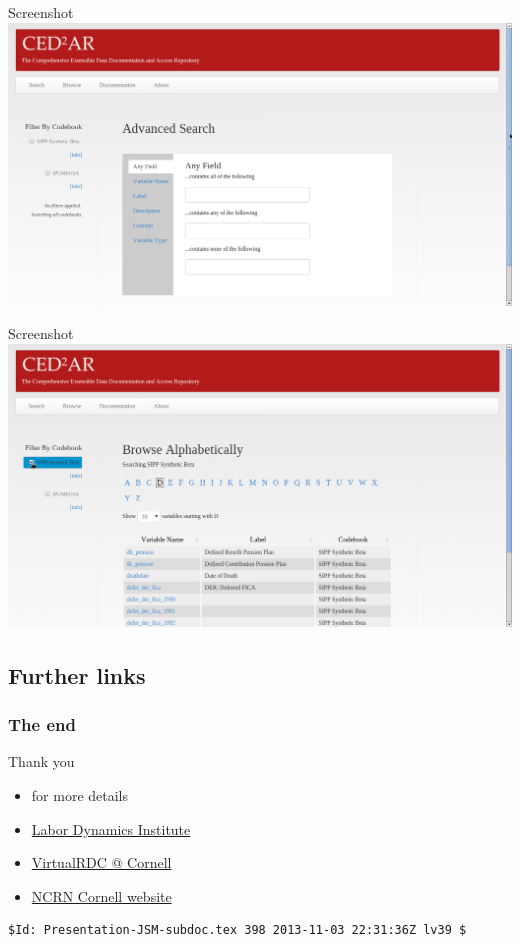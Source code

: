 \begin{frame}{Screenshot}
\includegraphics[width=\textwidth]{ced2ar-20130803-advanced.png}
\end{frame}
\begin{frame}{Screenshot}
\includegraphics[width=\textwidth]{ced2ar-20130803-browse.png}
\end{frame}

\subsection{Further links}
\begin{slide}
\frametitle{The end}
\begin{block}{Thank you}
\begin{itemize}
\item \cite{AbowdVilhuberBlock2012} for more details
\item \href{http://www.ilr.cornell.edu/LDI/}{Labor Dynamics Institute}
\item \href{http://www.vrdc.cornell.edu}{VirtualRDC @ Cornell}
\item \href{http://www.ncrn.cornell.edu/}{NCRN Cornell website}
\end{itemize}
\end{block}
\end{slide}

\begin{frame}[fragile]
\begin{verbatim}
$Id: Presentation-JSM-subdoc.tex 398 2013-11-03 22:31:36Z lv39 $
\end{verbatim}
\end{frame}

